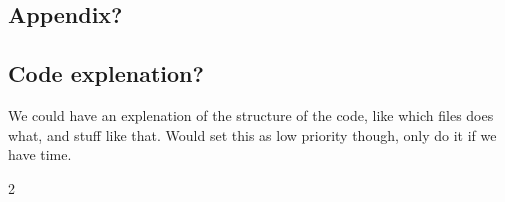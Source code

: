 \documentclass[a4paper,10pt,english]{article}
\begin{document}
\begin{multicols*}{2}
\section*{Appendix?}

\subsection*{Code explenation?}

We could have an explenation of the structure of the code, like which files does what, and stuff like that. Would set this as low priority though, only do it if we have time.



{}

\end{multicols*}{2}
\end{document}
